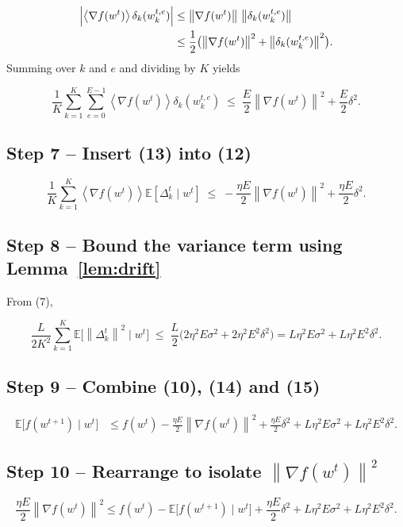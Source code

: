 \documentclass{article}
\newcommand{\E}{\mathbb{E}}
\newcommand{\norm}[1]{\left\|#1\right\|}
\newcommand{\inner}[1]{\left\langle #1 \right\rangle}
\begin{document}
\[
\begin{aligned}
\Bigl|\inner{\nabla f(w^{t})}{\delta_k(w_{k}^{t,e})}\Bigr|
&\le \norm{\nabla f(w^{t})}\,\norm{\delta_k(w_{k}^{t,e})} \\
&\le \frac12\bigl(\norm{\nabla f(w^{t})}^{2}
               +\norm{\delta_k(w_{k}^{t,e})}^{2}\bigr).
\end{aligned}
\]
Summing over $k$ and $e$ and dividing by $K$ yields

\[
\frac1K\sum_{k=1}^{K}\sum_{e=0}^{E-1}
   \inner{\nabla f(w^{t})}{\delta_k(w_{k}^{t,e})}
\;\le\;
\frac{E}{2}\norm{\nabla f(w^{t})}^{2}
   +\frac{E}{2}\delta^{2}.
\tag{13}
\]

\subsection*{Step 7 – Insert (13) into (12)}
\[
\frac1K\sum_{k=1}^{K}\inner{\nabla f(w^{t})}{\E[\Delta_{k}^{t}\mid w^{t}]}
\;\le\;
-\frac{\eta E}{2}\norm{\nabla f(w^{t})}^{2}
   +\frac{\eta E}{2}\delta^{2}.
\tag{14}
\]

\subsection*{Step 8 – Bound the variance term using Lemma~\ref{lem:drift}}
From (7),

\[
\frac{L}{2K^{2}}\sum_{k=1}^{K}\E\!\bigl[\norm{\Delta_{k}^{t}}^{2}\mid w^{t}\bigr]
\;\le\;
\frac{L}{2}\bigl(2\eta^{2}E\sigma^{2}+2\eta^{2}E^{2}\delta^{2}\bigr)
= L\eta^{2}E\sigma^{2}+L\eta^{2}E^{2}\delta^{2}.
\tag{15}
\]

\subsection*{Step 9 – Combine (10), (14) and (15)}
\[
\begin{aligned}
\E\bigl[f(w^{t+1})\mid w^{t}\bigr]
&\le f(w^{t})
   -\frac{\eta E}{2}\norm{\nabla f(w^{t})}^{2}
   +\frac{\eta E}{2}\delta^{2}
   +L\eta^{2}E\sigma^{2}
   +L\eta^{2}E^{2}\delta^{2}.
\end{aligned}
\tag{16}
\]

\subsection*{Step 10 – Rearrange to isolate $\norm{\nabla f(w^{t})}^{2}$}
\[
\frac{\eta E}{2}\norm{\nabla f(w^{t})}^{2}
\le f(w^{t})- \E\bigl[f(w^{t+1})\mid w^{t}\bigr]
    +\frac{\eta E}{2}\delta^{2}
    +L\eta^{2}E\sigma^{2}
    +L\eta^{2}E^{2}\delta^{2}.
\tag{17}
\]
\end{document}
